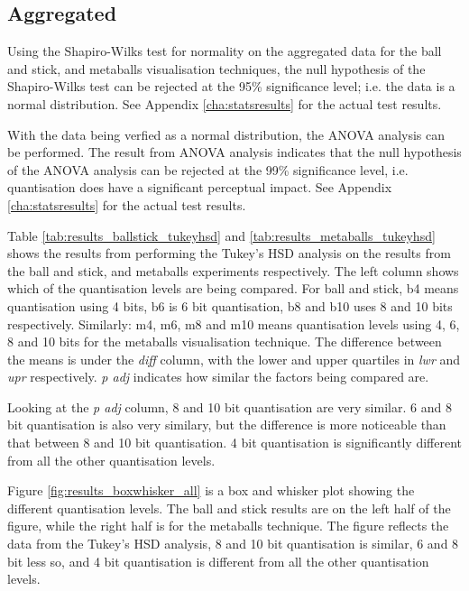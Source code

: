 
\subsection{Aggregated}
\label{sub:results_results_aggregated}

Using the Shapiro-Wilks test for normality on the aggregated data for the ball
and stick, and metaballs visualisation techniques, the null hypothesis of the
Shapiro-Wilks test can be rejected at the 95\% significance level; i.e. the
data is a normal distribution. See Appendix \ref{cha:statsresults} for the
actual test results.

With the data being verfied as a normal distribution, the ANOVA analysis can be
performed. The result from ANOVA analysis indicates that the null hypothesis of
the ANOVA analysis can be rejected at the 99\% significance level, i.e.
quantisation does have a significant perceptual impact. See Appendix
\ref{cha:statsresults} for the actual test results.

Table \ref{tab:results_ballstick_tukeyhsd} and
\ref{tab:results_metaballs_tukeyhsd} shows the results from performing the
Tukey's HSD analysis on the results from the ball and stick, and metaballs
experiments respectively. The left column shows which of the quantisation
levels are being compared. For ball and stick, b4 means quantisation using 4
bits, b6 is 6 bit quantisation, b8 and b10 uses 8 and 10 bits respectively.
Similarly: m4, m6, m8 and m10 means quantisation levels using 4, 6, 8 and 10
bits for the metaballs visualisation technique. The difference between the
means is under the \emph{diff} column, with the lower and upper quartiles in
\emph{lwr} and \emph{upr} respectively. \emph{p adj} indicates how similar the
factors being compared are.

Looking at the \emph{p adj} column, 8 and 10 bit quantisation are very similar.
6 and 8 bit quantisation is also very similary, but the difference is more
noticeable than that between 8 and 10 bit quantisation. 4 bit quantisation is
significantly different from all the other quantisation levels.

Figure \ref{fig:results_boxwhisker_all} is a box and whisker plot showing
the different quantisation levels. The ball and stick results are on the left
half of the figure, while the right half is for the metaballs technique. The
figure reflects the data from the Tukey's HSD analysis, 8 and 10 bit
quantisation is similar, 6 and 8 bit less so, and 4 bit quantisation is
different from all the other quantisation levels.

